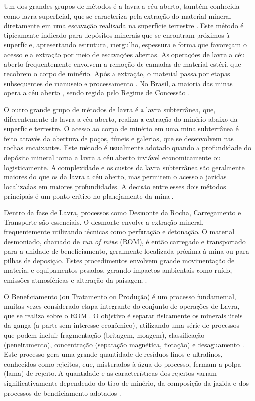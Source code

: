 Um dos grandes grupos de métodos é a lavra a céu aberto, também conhecida como lavra superficial, que se caracteriza pela extração do material mineral diretamente em uma escavação realizada na superfície terrestre \cite{jr2019, freire2020}. Este método é tipicamente indicado para depósitos minerais que se encontram próximos à superfície, apresentando estrutura, mergulho, espessura e forma que favoreçam o acesso e a extração por meio de escavações abertas. As operações de lavra a céu aberto frequentemente envolvem a remoção de camadas de material estéril que recobrem o corpo de minério. Após a extração, o material passa por etapas subsequentes de manuseio e processamento \cite{freire2020}. No Brasil, a maioria das minas opera a céu aberto \cite{carvalho2018, freire2020}, sendo regida pelo Regime de Concessão \cite{anm2022}.

O outro grande grupo de métodos de lavra é a lavra subterrânea, que, diferentemente da lavra a céu aberto, realiza a extração do minério abaixo da superfície terrestre. O acesso ao corpo de minério em uma mina subterrânea é feito através da abertura de poços, túneis e galerias, que se desenvolvem nas rochas encaixantes. Este método é usualmente adotado quando a profundidade do depósito mineral torna a lavra a céu aberto inviável economicamente ou logisticamente. A complexidade e os custos da lavra subterrânea são geralmente maiores do que os da lavra a céu aberto, mas permitem o acesso a jazidas localizadas em maiores profundidades. A decisão entre esses dois métodos principais é um ponto crítico no planejamento da mina \cite{jr2019, freire2020}.

Dentro da fase de Lavra, processos como Desmonte da Rocha, Carregamento e Transporte são essenciais. O desmonte envolve a extração mineral, frequentemente utilizando técnicas como perfuração e detonação. O material desmontado, chamado de \textit{run of mine} (ROM), é então carregado e transportado para a unidade de beneficiamento, geralmente localizada próxima à mina ou para pilhas de deposição. Estes procedimentos envolvem grande movimentação de material e equipamentos pesados, gerando impactos ambientais como ruído, emissões atmosféricas e alteração da paisagem \cite{carvalho2018, freire2020}.

O Beneficiamento (ou Tratamento ou Produção) é um processo fundamental, muitas vezes considerado etapa integrante do conjunto de operações de Lavra, que se realiza sobre o ROM \cite{carvalho2018}. O objetivo é separar fisicamente os minerais úteis da ganga (a parte sem interesse econômico), utilizando uma série de processos que podem incluir fragmentação (britagem, moagem), classificação (peneiramento), concentração (separação magnética, flotação) e desaguamento \cite{freire2020}. Este processo gera uma grande quantidade de resíduos finos e ultrafinos, conhecidos como rejeitos, que, misturados à água do processo, formam a polpa (lama) de rejeito. A quantidade e as características dos rejeitos variam significativamente dependendo do tipo de minério, da composição da jazida e dos processos de beneficiamento adotados \cite{ibram2016}.

